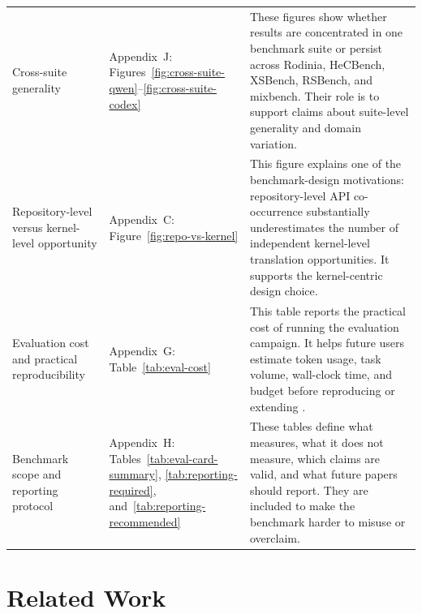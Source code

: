 \begin{center}
\begin{tabularx}{0.98\textwidth}{@{}
>{\RaggedRight\arraybackslash}p{}
>{\RaggedRight\arraybackslash}p{}
X
@{}}
Cross-suite generality
&
Appendix~J:
Figures~\ref{fig:cross-suite-qwen}--\ref{fig:cross-suite-codex}
&
These figures show whether results are concentrated in one benchmark suite or
persist across Rodinia, HeCBench, XSBench, RSBench, and mixbench. Their role is to
support claims about suite-level generality and domain variation. \\

Repository-level versus kernel-level opportunity
&
Appendix~C:
Figure~\ref{fig:repo-vs-kernel}
&
This figure explains one of the benchmark-design motivations: repository-level API
co-occurrence substantially underestimates the number of independent kernel-level
translation opportunities. It supports the kernel-centric design choice. \\

Evaluation cost and practical reproducibility
&
Appendix~G:
Table~\ref{tab:eval-cost}
&
This table reports the practical cost of running the evaluation campaign. It helps
future users estimate token usage, task volume, wall-clock time, and budget before
reproducing or extending \parbench{}. \\

Benchmark scope and reporting protocol
&
Appendix~H:
Tables~\ref{tab:eval-card-summary},
\ref{tab:reporting-required}, and~\ref{tab:reporting-recommended}
&
These tables define what \parbench{} measures, what it does not measure, which
claims are valid, and what future papers should report. They are included to make
the benchmark harder to misuse or overclaim. \\

\bottomrule
\end{tabularx}
\end{center}



\section{Related Work}
\label{sec:appendix-d}

